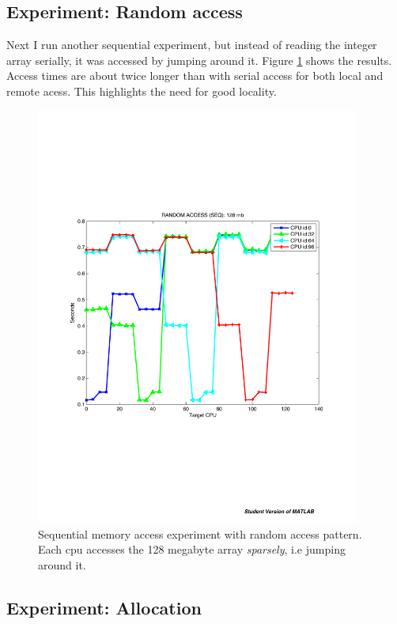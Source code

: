 \documentclass[12pt]{article}
\begin{document}
\subsection{Experiment: Random access}

Next I run another sequential experiment, but instead of reading the integer array serially, it was accessed by jumping around
it. Figure \ref{figseqran} shows the results. Access times are about twice longer than with serial access for both local and remote acess.
This highlights the need for good  locality. 

\begin{figure}[H]
\includegraphics[width=0.95\textwidth]{blacklight_ranseq_access.pdf}
\caption{Sequential memory access experiment with random access pattern. Each cpu accesses the 128 megabyte array \emph{sparsely}, i.e jumping around it. 
}
\label{figseqran}
\end{figure}

\subsection{Experiment: Allocation}
\end{document}
